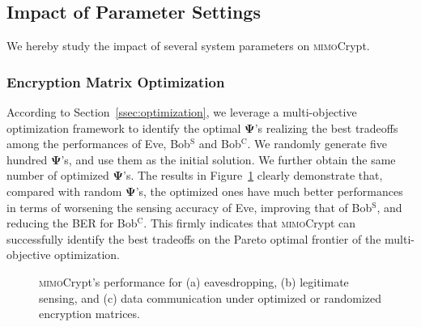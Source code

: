\documentclass[conference,compsoc]{IEEEtran}
\newcommand{\sname}{\textsc{mimo}Crypt\xspace}
\begin{document}
\subsection{Impact of Parameter Settings}
%
We hereby study the impact of several system parameters on \sname.


\subsubsection{Encryption Matrix Optimization}
\label{sssec:matrix_opti}
%
According to Section~\ref{ssec:optimization}, we leverage a multi-objective optimization framework to identify the optimal $\bm{\Psi}$'s realizing the best tradeoffs among the performances of Eve, Bob$^{\mathrm{S}}$ and Bob$^{\mathrm{C}}$. We randomly generate five hundred $\bm{\Psi}$'s, and use them as the initial solution. We further obtain the same number of optimized $\bm{\Psi}$'s. The results in Figure~\ref{fig:per_optMat} clearly demonstrate that, compared with random $\bm{\Psi}$'s, the optimized ones have much better performances in terms of worsening the sensing accuracy of Eve, improving that of Bob$^{\mathrm{S}}$, and  reducing the BER for Bob$^{\mathrm{C}}$. This firmly indicates that \sname can successfully identify the best tradeoffs on the Pareto optimal frontier of the multi-objective optimization.  
%
\begin{figure}[t]
	\setlength\abovecaptionskip{8pt}
	\vspace{-1.5ex}
	\centering
	\caption{{\sname's performance for (a) eavesdropping, (b) legitimate sensing, and (c) data communication under optimized or randomized encryption matrices.}}
	\label{fig:per_optMat}
	\vspace{-1.5ex}
\end{figure}
\end{document}
